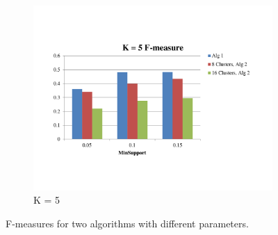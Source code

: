 \begin{figure}
\begin{subfigure}[b]{0.3\textwidth}
         \includegraphics[width=\textwidth]{F-measure5}
         \caption{K = 5}
         \label{Fig:F-measure5}
        \end{subfigure}
        \caption{F-measures for two algorithms with different parameters.}
        \label{Fig:F-measure}
\end{figure}
